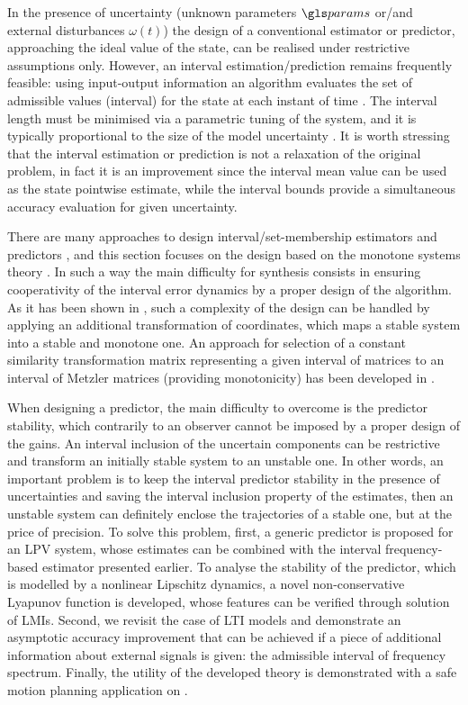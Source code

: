 In the presence of uncertainty (unknown parameters $\params$ or/and external disturbances $\omega(t)$) the design of a conventional estimator or predictor, approaching the ideal value of the state, can be realised under restrictive assumptions only. However, an interval estimation/prediction remains frequently feasible: using input-output information an algorithm evaluates the set of admissible values (interval) for the state at each instant of time \citep{Efimov2016,Raiessi2018}. The interval length must be minimised via a parametric tuning of the system, and it is typically proportional to the size of the model uncertainty \citep{Chebotarev2015}. It is worth stressing that the interval estimation or prediction is not a relaxation of the original problem, in fact it is an improvement since the interval mean value can be used as the state pointwise estimate, while the interval bounds provide a simultaneous accuracy evaluation for given uncertainty.

There are many approaches to design interval/set-membership estimators and predictors \citep{Jaulin02,Kieffer2004,Bernard_Gouze04,Moisan_Bernard_Gouze09}, and this section focuses on the design based on the monotone systems theory \citep{Bernard_Gouze04,Moisan_Bernard_Gouze09,RVZ10,REZ11,Efimov2012}.
In such a way the main difficulty for synthesis consists in ensuring cooperativity of the interval error dynamics by a proper design of the algorithm. As it has been shown in \citep{MazencBernard11,REZ11,Combastel2012}, such a complexity of the design can be handled by applying an additional transformation of coordinates, which maps a stable system into a stable and monotone one. An approach for selection of a constant similarity transformation matrix representing a given interval of matrices to an interval of Metzler matrices (providing monotonicity) has been developed in \citep{Efimov_a2013,Chebotarev2015}. 

When designing a predictor, the main difficulty to overcome is the predictor stability, which contrarily to an observer cannot be imposed by a proper design of the gains. An interval inclusion of the uncertain components can be restrictive and transform an initially stable system to an unstable one. In other words, an important problem is to keep the interval predictor stability in the presence of uncertainties and saving the interval inclusion property of the estimates, then an unstable system can definitely enclose the trajectories of a stable one, but at the price of precision. To solve this problem, first, a generic predictor is proposed for an \gls{LPV} system, whose estimates can be combined with the interval frequency-based estimator presented earlier. To analyse the stability of the predictor, which is modelled by a nonlinear Lipschitz dynamics, a novel non-conservative Lyapunov function is developed, whose features can be verified through solution of \glspl{LMI}. Second, we revisit the case of \gls{LTI} models and demonstrate an asymptotic accuracy improvement that can be achieved if a piece of  additional information about external signals is given: the admissible interval of frequency spectrum. Finally, the utility of the developed theory is demonstrated with a safe motion planning application on \highwayenv.

